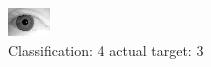\begin{figure}[h!]
\begin{center}
\includegraphics[width=0.60\columnwidth]{figures/ID2052_class_4_target_3.png}
\end{center}
\caption{ Classification: 4 actual target: 3}
\label{fig:ID2052_class_4_target_3}
\end{figure}
